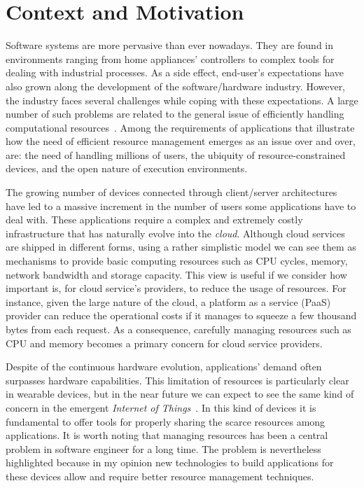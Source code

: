 \section{Context and Motivation}

Software systems are more pervasive than ever nowadays.
They are found in environments ranging from home appliances' controllers to complex tools for dealing with industrial processes.
As a side effect, end-user's expectations have also grown along the development of the software/hardware industry.
However, the industry faces several challenges while coping with these expectations.
A large number of such problems are related to the general issue of efficiently handling computational resources~\cite{}.
Among the requirements of applications that illustrate how the need of efficient resource management emerges as an issue over and over, are: the need of handling millions of users, the ubiquity of resource-constrained devices, and the open nature of execution environments.

The growing number of devices connected through client/server architectures have led to a massive increment in the number of users some applications have to deal with.
These applications require a complex and extremely costly infrastructure that has naturally evolve into the \textit{cloud}.
Although cloud services are shipped in different forms, using a rather simplistic model we can see them as mechanisms to provide basic computing resources such as CPU cycles, memory, network bandwidth and storage capacity.
This view is useful if we consider how important is, for cloud service's providers, to reduce the usage of resources.
For instance, given the large nature of the cloud, a platform as a service (PaaS)~\cite{} provider can reduce the operational costs if it manages to squeeze a few thousand bytes from each request.
As a consequence, carefully managing resources such as CPU and memory becomes a primary concern for cloud service providers.

Despite of the continuous hardware evolution, applications' demand often surpasses hardware capabilities.
This limitation of resources is particularly clear in wearable devices, but in the near future we can expect to see the same kind of concern in the emergent \textit{Internet of Things}~\cite{}.
In this kind of devices it is fundamental to offer tools for properly sharing the scarce resources among applications.
It is worth noting that managing resources has been a central problem in software engineer for a long time.
The problem is nevertheless highlighted because in my opinion new technologies to build applications for these devices allow and require better resource management techniques.

